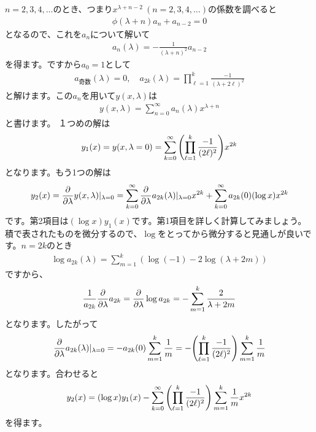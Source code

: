 \documentclass[report,paper=a4, fontsize=12pt, line_length=16cm, number_of_lines=33,dvipdfmx]{jlreq}
\numberwithin{equation}{section}
\begin{document}
$n=2,3,4,\dots$のとき、つまり$x^{\lambda+n-2}\ (n=2,3,4,\dots)$の係数を調べると
\begin{align}
  \phi(\lambda+n)a_n+a_{n-2}=0
\end{align}
となるので、これを$a_n$について解いて
\begin{align}
  a_n(\lambda)=-\frac{1}{(\lambda+n)^2}a_{n-2}
\end{align}
を得ます。ですから$a_0=1$として
\begin{align}
  a_{\text{奇数}}(\lambda)=0,\quad
  a_{2k}(\lambda)=\prod_{\ell=1}^{k}\frac{-1}{(\lambda+2\ell)^2}
\end{align}
と解けます。この$a_n$を用いて$y(x,\lambda)$は
\begin{align}
  y(x,\lambda)=\sum_{n=0}^{\infty}a_n(\lambda)x^{\lambda+n}
\end{align}
と書けます。
１つめの解は
\begin{align}
  y_1(x)=y(x,\lambda=0)=\sum_{k=0}^{\infty}
  \qty(\prod_{\ell=1}^{k}\frac{-1}{(2\ell)^2}) x^{2k}\label{exfrobeniussolution1}
\end{align}
となります。もう1つの解は
\begin{align}
  y_{2}(x)=\pdv{\lambda} y(x,\lambda)
  |_{\lambda=0}
  =\sum_{k=0}^{\infty}\pdv{\lambda} a_{2k}(\lambda) 
  |_{\lambda=0}x^{2k}
  +\sum_{k=0}^{\infty}a_{2k}(0) (\log x) x^{2k}
\end{align}
です。第2項目は$(\log x) y_1(x)$です。第1項目を詳しく計算してみましょう。積で表されたものを微分するので、$\log$をとってから微分すると見通しが良いです。$n=2k$のとき
\begin{align}
  \log a_{2k}(\lambda)=\sum_{m=1}^{k}(\log(-1)-2\log (\lambda+2m))
\end{align}
ですから、
\begin{align}
  \frac{1}{a_{2k}}\pdv{\lambda}a_{2k}=
  \pdv{\lambda} \log a_{2k}
  =-\sum_{m=1}^{k}\frac{2}{\lambda+2m}
\end{align}
となります。したがって
\begin{align}
  \pdv{\lambda} a_{2k}(\lambda)|_{\lambda=0}
  =-a_{2k}(0)\sum_{m=1}^{k}\frac{1}{m}
  =-\qty(\prod_{\ell=1}^{k}\frac{-1}{(2\ell)^2})\sum_{m=1}^{k}\frac{1}{m}
\end{align}
となります。合わせると
\begin{align}
  y_2(x)=(\log x) y_1(x)-\sum_{k=0}^{\infty}
  \qty(\prod_{\ell=1}^{k}\frac{-1}{(2\ell)^2})\sum_{m=1}^{k}\frac{1}{m} x^{2k}\label{exfrobeniussolution2}
\end{align}
を得ます。
\end{document}
